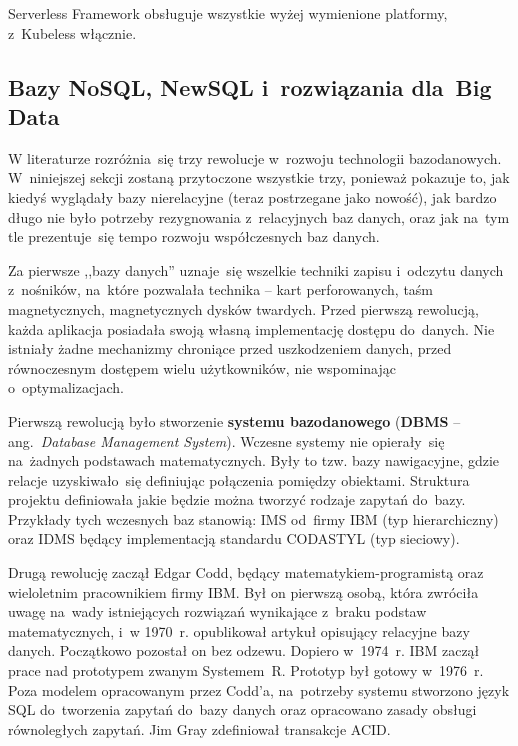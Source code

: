 \documentclass[12pt,a4paper,twoside,titlepage,openright]{book}
\begin{document}
Serverless Framework obsługuje wszystkie wyżej wymienione platformy, z~Kubeless włącznie.\cite{siteServerlessFramework}


\subsection{Bazy NoSQL, NewSQL i~rozwiązania dla~Big Data} \label{section:nosql}

W literaturze rozróżnia~się trzy rewolucje w~rozwoju technologii bazodanowych.  \cite{noSqlHistory} W~niniejszej sekcji zostaną przytoczone wszystkie trzy, ponieważ pokazuje to, jak kiedyś wyglądały bazy nierelacyjne (teraz postrzegane jako nowość), jak bardzo długo nie było potrzeby rezygnowania z~relacyjnych baz danych, oraz jak na~tym tle prezentuje~się tempo rozwoju współczesnych baz danych.

Za pierwsze ,,bazy danych'' uznaje~się wszelkie techniki zapisu i~odczytu danych z~nośników, na~które pozwalała technika -- kart perforowanych, taśm magnetycznych, magnetycznych dysków twardych. Przed pierwszą rewolucją, każda aplikacja posiadała swoją własną implementację dostępu do~danych. Nie istniały żadne mechanizmy chroniące przed uszkodzeniem danych, przed równoczesnym dostępem wielu użytkowników, nie wspominając o~optymalizacjach. 

Pierwszą rewolucją było stworzenie \textbf{systemu bazodanowego} (\textbf{DBMS} -- ang.~\textit{Database Management System}). Wczesne systemy nie opierały~się na~żadnych podstawach matematycznych. Były to tzw. bazy nawigacyjne, gdzie relacje uzyskiwało~się definiując połączenia pomiędzy obiektami. Struktura projektu definiowała jakie będzie można tworzyć rodzaje zapytań do~bazy. Przykłady tych wczesnych baz stanowią: IMS od~firmy IBM (typ hierarchiczny) oraz IDMS będący implementacją standardu CODASTYL (typ sieciowy). 

Drugą rewolucję zaczął Edgar Codd, będący matematykiem-programistą oraz wieloletnim pracownikiem firmy IBM. Był on pierwszą osobą, która zwróciła uwagę na~wady istniejących rozwiązań wynikające z~braku podstaw matematycznych, i~w 1970~r. opublikował artykuł opisujący relacyjne bazy danych. Początkowo pozostał on bez odzewu. Dopiero w~1974~r. IBM zaczął prace nad prototypem zwanym Systemem~R. Prototyp był gotowy w~1976~r. Poza modelem opracowanym przez Codd'a, na~potrzeby systemu stworzono język SQL do~tworzenia zapytań do~bazy danych oraz opracowano zasady obsługi równoległych zapytań. Jim Gray zdefiniował transakcje ACID.
\end{document}
